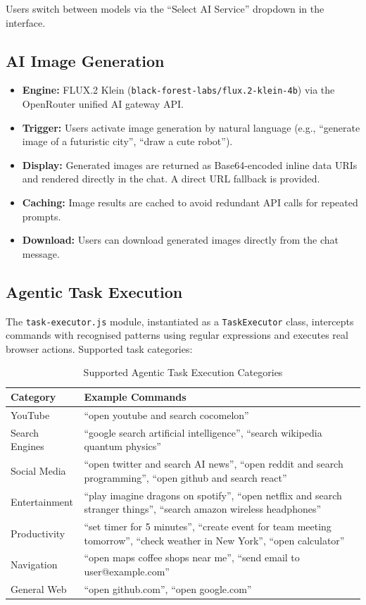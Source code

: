 Users switch between models via the ``Select AI Service'' dropdown in the interface.

\subsection{AI Image Generation}
\begin{itemize}[leftmargin=*]
    \item \textbf{Engine:} FLUX.2 Klein (\texttt{black-forest-labs/flux.2-klein-4b}) via the OpenRouter unified AI gateway API.
    \item \textbf{Trigger:} Users activate image generation by natural language (e.g., ``generate image of a futuristic city'', ``draw a cute robot'').
    \item \textbf{Display:} Generated images are returned as Base64-encoded inline data URIs and rendered directly in the chat. A direct URL fallback is provided.
    \item \textbf{Caching:} Image results are cached to avoid redundant API calls for repeated prompts.
    \item \textbf{Download:} Users can download generated images directly from the chat message.
\end{itemize}

\subsection{Agentic Task Execution}
The \texttt{task-executor.js} module, instantiated as a \texttt{TaskExecutor} class, intercepts commands with recognised patterns using regular expressions and executes real browser actions. Supported task categories:

\begin{longtable}{|p{3.5cm}|p{10cm}|}
\caption{Supported Agentic Task Execution Categories} \\
\hline
\textbf{Category} & \textbf{Example Commands} \\ \hline
\endhead
YouTube & ``open youtube and search cocomelon'' \\ \hline
Search Engines & ``google search artificial intelligence'', ``search wikipedia quantum physics'' \\ \hline
Social Media & ``open twitter and search AI news'', ``open reddit and search programming'', ``open github and search react'' \\ \hline
Entertainment & ``play imagine dragons on spotify'', ``open netflix and search stranger things'', ``search amazon wireless headphones'' \\ \hline
Productivity & ``set timer for 5 minutes'', ``create event for team meeting tomorrow'', ``check weather in New York'', ``open calculator'' \\ \hline
Navigation & ``open maps coffee shops near me'', ``send email to user@example.com'' \\ \hline
General Web & ``open github.com'', ``open google.com'' \\ \hline
\end{longtable}

